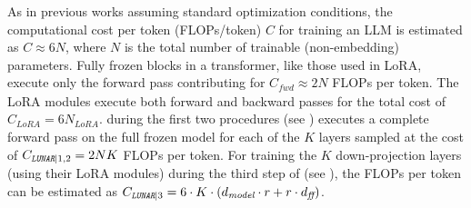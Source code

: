 As in previous works \citep{kaplanscalinglaws} assuming standard optimization conditions, the computational cost per token (FLOPs/token) $C$ for training an LLM is estimated as $C \approx 6N$, where $N$ is the total number of trainable (non-embedding) parameters.
Fully frozen blocks in a transformer, like those used in LoRA, execute only the forward pass contributing for $C_{\textit{fwd}} \approx 2N$ FLOPs per token.
The LoRA modules execute both forward and backward passes for the total cost of $C_{\textit{LoRA}} = 6N_{\textit{LoRA}}$.
\lunar during the first two procedures (see ) executes a complete forward pass on the full frozen model for each of the $K$ layers sampled at the cost of $C_{\textit{\texttt{LUNAR}}|1,2} = 2NK$ FLOPs per token.
For training the $K$ down-projection layers (using their LoRA modules) during the third step of \lunar (see ), the FLOPs per token can be estimated as $C_{\textit{\texttt{LUNAR}}|3} = 6 \cdot K \cdot (d_{\textit{model}} \cdot r + r \cdot d_{\textit{ff}})$.




%




